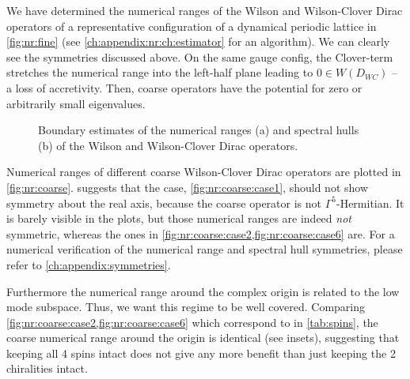 We have determined the numerical ranges of the Wilson and Wilson-Clover Dirac operators of a representative configuration of a dynamical periodic lattice in \cref{fig:nr:fine} (see \cref{ch:appendix:nr:ch:estimator} for an algorithm).
We can clearly see the symmetries discussed above.
On the same gauge config, the Clover-term stretches the numerical range into the left-half plane leading to $0 \in W(D_{WC})$ -- a loss of accretivity.
Then, coarse operators have the potential for zero or arbitrarily small eigenvalues.

\begin{figure}
\centering

\hfill
{}

\caption{
Boundary estimates of the numerical ranges (a) and spectral hulls (b) of the Wilson and Wilson-Clover Dirac operators.
}
\label{fig:fine}
\end{figure}

Numerical ranges of different coarse Wilson-Clover Dirac operators are plotted in \cref{fig:nr:coarse}.
 suggests that the  case, \cref{fig:nr:coarse:case1}, should not show symmetry about the real axis, because the coarse operator is not $\Gamma^{5}$-Hermitian.
It is barely visible in the plots, but those numerical ranges are indeed \emph{not} symmetric, whereas the ones in \cref{fig:nr:coarse:case2,fig:nr:coarse:case6} are.
For a numerical verification of the numerical range and spectral hull symmetries, please refer to \cref{ch:appendix:symmetries}.

Furthermore the numerical range around the complex origin is related to the low mode subspace.
Thus, we want this regime to be well covered.
Comparing \cref{fig:nr:coarse:case2,fig:nr:coarse:case6} which correspond to  in \cref{tab:spins}, the coarse numerical range around the origin is identical (see insets), suggesting that keeping all \num{4} spins intact does not give any more benefit than just keeping the \num{2} chiralities intact.

